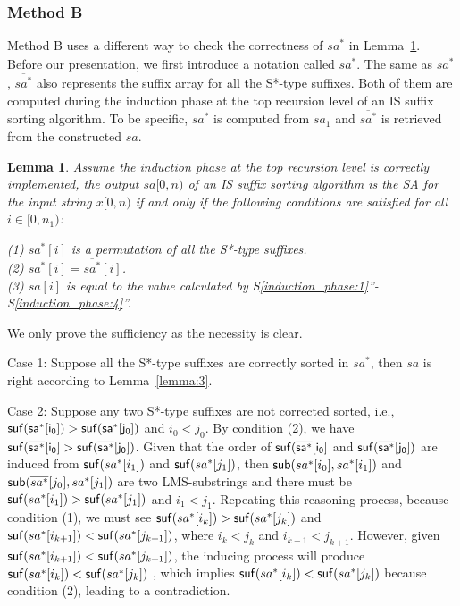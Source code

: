 \documentclass[10pt,journal,compsoc]{IEEEtran}
\newtheorem{lemma}[theorem]{Lemma}
\begin{document}
\subsubsection{Method B}\label{sec:proposals:method_b}

Method B uses a different way to check the correctness of $sa^*$ in Lemma~\ref{lemma:4}. Before our presentation, we first introduce a notation called $\overline{sa^*}$. The same as $sa^*$, $\overline{sa^*}$ also represents the suffix array for all the S*-type suffixes. Both of them are computed during the induction phase at the top recursion level of an IS suffix sorting algorithm. To be specific, $sa^*$ is computed from $sa_1$ and $\overline{sa^*}$ is retrieved from the constructed $sa$.

{\color{red}
\begin{lemma} \label{lemma:4}
    Assume the induction phase at the top recursion level is correctly implemented, the output $sa[0, n)$ of an IS suffix sorting algorithm is the SA for the input string $x[0, n)$ if and only if the following conditions are satisfied for all $i \in [0, n_1)$:

	(1) $sa^*[i]$ is a permutation of all the S*-type suffixes. \\
	(2) $sa^*[i] = \overline{sa^*}[i]$. \\
	(3) $sa[i]$ is equal to the value calculated by S\ref{induction_phase:1}''-S\ref{induction_phase:4}''. \\

\end{lemma}

\begin{IEEEproof}

    We only prove the sufficiency as the necessity is clear.

    Case 1: Suppose all the S*-type suffixes are correctly sorted in $sa^*$, then $sa$ is right according to Lemma~\ref{lemma:3}.

    Case 2: Suppose any two S*-type suffixes are not corrected sorted, i.e., $\sf suf(sa^*[i_0]) > \sf suf(sa^*[j_0])$ and $i_0 < j_0$. By condition (2), we have $\sf suf(\overline{sa^*}[i_0] > \sf suf(\overline{sa^*}[j_0])$. Given that the order of $\sf suf(\overline{sa^*}[i_0]$ and $\sf suf(\overline{sa^*}[j_0])$ are induced from ${\sf suf}(sa^*[i_1])$ and ${\sf suf}(sa^*[j_1])$, then ${\sf sub}(\overline{sa^*}[i_0], sa^*[i_1])$ and ${\sf sub}(\overline{sa^*}[j_0], sa^*[j_1])$ are two LMS-substrings and there must be ${\sf suf}(sa^*[i_1])>{\sf suf}(sa^*[j_1])$ and $i_1 < j_1$. Repeating this reasoning process, because condition (1), we must see ${\sf suf}(sa^*[i_k])>{\sf suf}(sa^*[j_k])$ and ${\sf suf}(sa^*[i_{k+1}])<{\sf suf}(sa^*[j_{k+1}])$, where $i_k < j_k$ and $i_{k+1} < j_{k+1}$. However, given ${\sf suf}(sa^*[i_{k+1}])<{\sf suf}(sa^*[j_{k+1}])$, the inducing process will produce ${\sf suf}(\overline{sa^*}[i_k])<{\sf suf}(\overline{sa^*}[j_k])$ , which implies ${\sf suf}(sa^*[i_k])<{\sf suf}(sa^*[j_k])$ because condition (2), leading to a contradiction.
	
\end{IEEEproof}
}	
\end{document}

